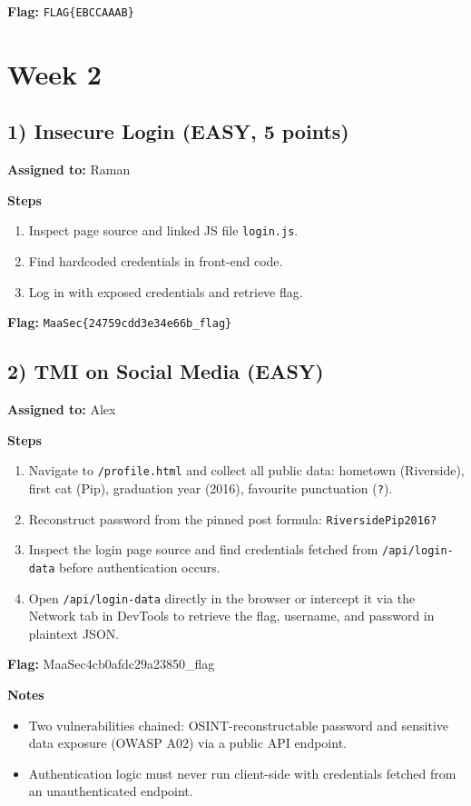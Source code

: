\documentclass[10pt,a4paper]{article}
\begin{document}
\textbf{Flag:} \texttt{FLAG\{EBCCAAAB\}}

\section{Week 2}

\subsection*{1) Insecure Login (EASY, 5 points)}
\textbf{Assigned to:} Raman

\textbf{Steps}
\begin{enumerate}[leftmargin=*,noitemsep]
  \item Inspect page source and linked JS file \texttt{login.js}.
  \item Find hardcoded credentials in front-end code.
  \item Log in with exposed credentials and retrieve flag.
\end{enumerate}

\textbf{Flag:} \texttt{MaaSec\{24759cdd3e34e66b\_flag\}}

\subsection*{2) TMI on Social Media (EASY)}
\textbf{Assigned to:} Alex

\textbf{Steps}
\begin{enumerate}[leftmargin=*,noitemsep]
  \item Navigate to \texttt{/profile.html} and collect all public data:
  hometown (Riverside), first cat (Pip), graduation year (2016),
  favourite punctuation (\texttt{?}).
  \item Reconstruct password from the pinned post formula:
  \texttt{RiversidePip2016?}
  \item Inspect the login page source and find credentials fetched
  from \texttt{/api/login-data} before authentication occurs.
  \item Open \texttt{/api/login-data} directly in the browser or
  intercept it via the Network tab in DevTools to retrieve the
  flag, username, and password in plaintext JSON.
\end{enumerate}

\textbf{Flag:} MaaSec{4cb0afdc29a23850\_flag}

\textbf{Notes}
\begin{itemize}[leftmargin=*,noitemsep]
  \item Two vulnerabilities chained: OSINT-reconstructable password
  and sensitive data exposure (OWASP A02) via a public API endpoint.
  \item Authentication logic must never run client-side with
  credentials fetched from an unauthenticated endpoint.
\end{itemize}
\end{document}
